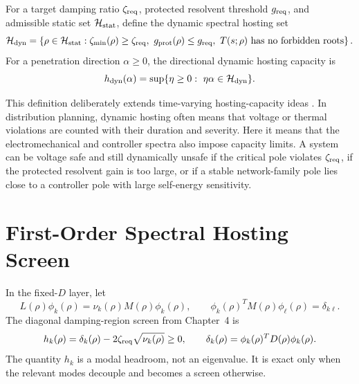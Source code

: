 \begin{definition}
For a target damping ratio \(\zeta_{\rm req}\), protected resolvent threshold
\(g_{\rm req}\), and admissible static set \(\mathcal H_{\rm stat}\), define
the dynamic spectral hosting set
\begin{equation}
  \mathcal H_{\rm dyn}
  =
  \left\{
  \rho\in\mathcal H_{\rm stat}:
  \zeta_{\min}(\rho)\ge \zetaReq,\ 
  g_{\rm prot}(\rho)\le g_{\rm req},\
  T(s;\rho)\hbox{ has no forbidden roots}
  \right\}.
  \label{eq:dynamic_hosting_set}
\end{equation}
For a penetration direction \(\alpha\ge0\), the directional dynamic hosting
capacity is
\begin{equation}
  h_{\rm dyn}(\alpha)
  =
  \sup\{\eta\ge0:\ \eta\alpha\in\mathcal H_{\rm dyn}\}.
  \label{eq:directional_dynamic_hosting}
\end{equation}
\end{definition}

This definition deliberately extends time-varying hosting-capacity ideas
\cite{oliveira2019dynamicHosting,jain2020dynamicHosting}. In distribution
planning, dynamic hosting often means that voltage or thermal violations are
counted with their duration and severity. Here it means that the electromechanical
and controller spectra also impose capacity limits. A system can be voltage
safe and still dynamically unsafe if the critical pole violates
\(\zeta_{\rm req}\), if the protected resolvent gain is too large, or if a stable
network-family pole lies close to a controller pole with large self-energy
sensitivity.

\section{First-Order Spectral Hosting Screen}

In the fixed-\(D\) layer, let
\begin{equation}
  L(\rho)\phi_k(\rho)
  =
  \nu_k(\rho)M(\rho)\phi_k(\rho),
  \qquad
  \phi_k(\rho)^TM(\rho)\phi_\ell(\rho)=\delta_{k\ell}.
  \label{eq:hosting_generalized_modes}
\end{equation}
The diagonal damping-region screen from Chapter~4 is
\begin{equation}
  h_k(\rho)
  =
  \delta_k(\rho)-2\zeta_{\rm req}\sqrt{\nu_k(\rho)}
  \ge0,
  \qquad
  \delta_k(\rho)=\phi_k(\rho)^TD(\rho)\phi_k(\rho).
  \label{eq:hosting_modal_gap}
\end{equation}
The quantity \(h_k\) is a modal headroom, not an eigenvalue. It is exact only
when the relevant modes decouple and becomes a screen otherwise.

